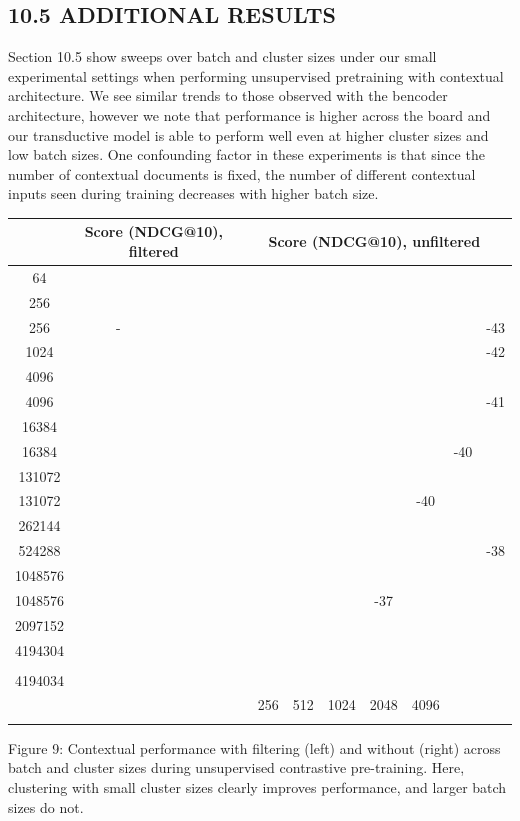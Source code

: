 \subsection*{10.5 ADDITIONAL RESULTS}
Section 10.5 show sweeps over batch and cluster sizes under our small experimental settings when performing unsupervised pretraining with contextual architecture. We see similar trends to those observed with the bencoder architecture, however we note that performance is higher across the board and our transductive model is able to perform well even at higher cluster sizes and low batch sizes.
One confounding factor in these experiments is that since the number of contextual documents is fixed, the number of different contextual inputs seen during training decreases with higher batch size.

\begin{tabular}{|c|c|c|c|c|c|c|c|c|c|l|}
\hline & \multicolumn{2}{|c|}{ Score (NDCG@10), filtered } & \multicolumn{8}{|c|}{ Score (NDCG@10), unfiltered } \\
\hline 64 & & & & & & & & & & \\
\hline 256 & & & & & & & & & & \\
\hline 256 & - & & & & & & & & & -43 \\
\hline 1024 & & & & & & & & & & -42 \\
\hline 4096 & & & & & & & & & & \\
\hline 4096 & & & & & & & & & & -41 \\
\hline 16384 & & & & & & & & & & \\
\hline 16384 & & & & & & & & & -40 \\
\hline 131072 & & & & & & & & & & \\
\hline 131072 & & & & & & & & -40 \\
\hline 262144 & & & & & & & & & & \\
\hline 524288 & & & & & & & & & & -38 \\
\hline 1048576 & & & & & & & & & & \\
\hline 1048576 & & & & & & & -37 \\
\hline 2097152 & & & & & & & & & & \\
\hline 4194304 & & & & & & & & & & \\
\hline & & & & & & & & & & \\
\hline 4194034 & & & & & & & & & & \\
\hline & & & & 256 & 512 & 1024 & 2048 & 4096 & \\
\hline & & & & & & & & & & \\
\hline
\end{tabular}
Figure 9: Contextual performance with filtering (left) and without (right) across batch and cluster sizes during unsupervised contrastive pre-training. Here, clustering with small cluster sizes clearly improves performance, and larger batch sizes do not.

